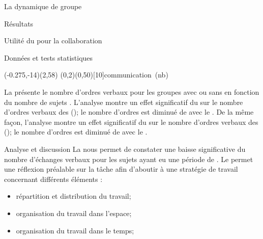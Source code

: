 \documentclass[myfrancais,ngerman,english,french]{mythesis}
\begin{document}
\begin{mychapter}{La dynamique de groupe}
\begin{mysection}{Résultats}
\begin{mysubsection}{Utilité du \mybrainstorming pour la collaboration}
\begin{mysubsubsection}{Données et tests statistiques}
					\begin{myfigure}
						\begin{myps}(-0.275,-14)(2,58)
							\myaxes(0,2){\mybrainstorming}(0,50)[10]{communication~(nb)}
						\end{myps}
					\end{myfigure}

					La  présente le nombre d'ordres verbaux  pour les groupes avec ou sans \mybrainstorming {} en fonction du nombre de sujets .
					L'analyse montre un effet significatif du \mybrainstorming {} sur le nombre d'ordres verbaux  des  (); le nombre d'ordres est diminué de  avec le \mybrainstorming.
					De la même façon, l'analyse montre un effet significatif du \mybrainstorming {} sur le nombre d'ordres verbaux  des  (); le nombre d'ordres est diminué de  avec le \mybrainstorming.
				\end{mysubsubsection}
				\begin{mysubsubsection}{Analyse et discussion}
					La  nous permet de constater une baisse significative du nombre d'échanges verbaux pour les sujets ayant eu une période de \mybrainstorming.
					Le \mybrainstorming permet une réflexion préalable sur la tâche afin d'aboutir à une stratégie de travail concernant différents éléments :
					\begin{itemize}
						\item répartition et distribution du travail;
						\item organisation du travail dans l'espace;
						\item organisation du travail dans le temps;

\end{itemize}
\end{mysubsubsection}
\end{mysubsection}
\end{mysection}
\end{mychapter}
\end{document}
